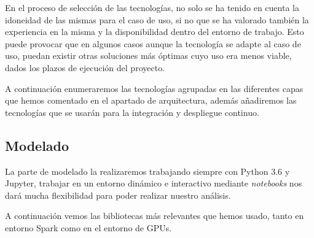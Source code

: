 En el proceso de selección de las tecnologías, no solo se ha tenido en cuenta la idoneidad de las mismas para el caso de uso, si no que se ha valorado también la experiencia en la misma y la disponibilidad dentro del entorno de trabajo. Esto puede provocar que en algunos casos aunque la tecnología se adapte al caso de uso, puedan existir otras soluciones más óptimas cuyo uso era menos viable, dados los plazos de ejecución del proyecto. 

A continuación enumeraremos las tecnologías agrupadas en las diferentes capas que hemos comentado en el apartado de arquitectura, además añadiremos las tecnologías que se usarán para la integración y despliegue continuo. 

\subsection{Modelado}


La parte de modelado la realizaremos trabajando siempre con Python 3.6 y Jupyter, trabajar en un entorno dinámico e interactivo mediante \textit{notebooks} nos dará mucha flexibilidad para poder realizar nuestro análisis.

A continuación vemos las bibliotecas más relevantes que hemos usado, tanto en entorno Spark como en el entorno de GPUs.


